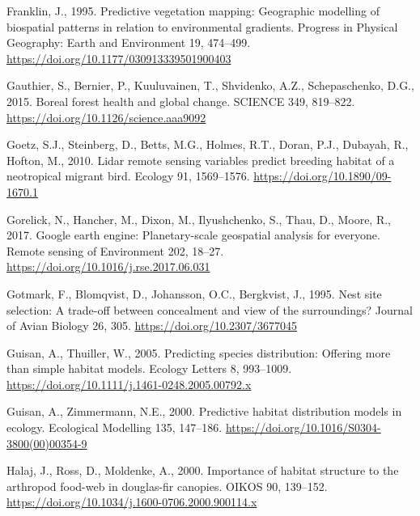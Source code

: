 \documentclass[
  12pt,
]{article}
\newlength{\cslhangindent}
\newlength{\cslentryspacingunit} %
\newenvironment{CSLReferences}[2] %
 {%
  \setlength{\parindent}{0pt}
  \ifodd #1
  \let\oldpar\par
  \def\par{\hangindent=\cslhangindent\oldpar}
  \fi
  \setlength{\parskip}{#2\cslentryspacingunit}
 }%
 {}
\begin{document}
\begin{CSLReferences}{1}{0}
\leavevmode{}%
Franklin, J., 1995. Predictive vegetation mapping: Geographic modelling of biospatial patterns in relation to environmental gradients. Progress in Physical Geography: Earth and Environment 19, 474--499. \url{https://doi.org/10.1177/030913339501900403}

\leavevmode{}%
Gauthier, S., Bernier, P., Kuuluvainen, T., Shvidenko, A.Z., Schepaschenko, D.G., 2015. Boreal forest health and global change. {SCIENCE} 349, 819--822. \url{https://doi.org/10.1126/science.aaa9092}

\leavevmode{}%
Goetz, S.J., Steinberg, D., Betts, M.G., Holmes, R.T., Doran, P.J., Dubayah, R., Hofton, M., 2010. Lidar remote sensing variables predict breeding habitat of a neotropical migrant bird. Ecology 91, 1569--1576. \url{https://doi.org/10.1890/09-1670.1}

\leavevmode{}%
Gorelick, N., Hancher, M., Dixon, M., Ilyushchenko, S., Thau, D., Moore, R., 2017. Google earth engine: Planetary-scale geospatial analysis for everyone. Remote sensing of Environment 202, 18--27. \url{https://doi.org/10.1016/j.rse.2017.06.031}

\leavevmode{}%
Gotmark, F., Blomqvist, D., Johansson, O.C., Bergkvist, J., 1995. Nest site selection: A trade-off between concealment and view of the surroundings? Journal of Avian Biology 26, 305. \url{https://doi.org/10.2307/3677045}

\leavevmode{}%
Guisan, A., Thuiller, W., 2005. Predicting species distribution: Offering more than simple habitat models. Ecology Letters 8, 993--1009. \url{https://doi.org/10.1111/j.1461-0248.2005.00792.x}

\leavevmode{}%
Guisan, A., Zimmermann, N.E., 2000. Predictive habitat distribution models in ecology. Ecological Modelling 135, 147--186. \url{https://doi.org/10.1016/S0304-3800(00)00354-9}

\leavevmode{}%
Halaj, J., Ross, D., Moldenke, A., 2000. Importance of habitat structure to the arthropod food-web in douglas-fir canopies. {OIKOS} 90, 139--152. \url{https://doi.org/10.1034/j.1600-0706.2000.900114.x}


\end{CSLReferences}
\end{document}
